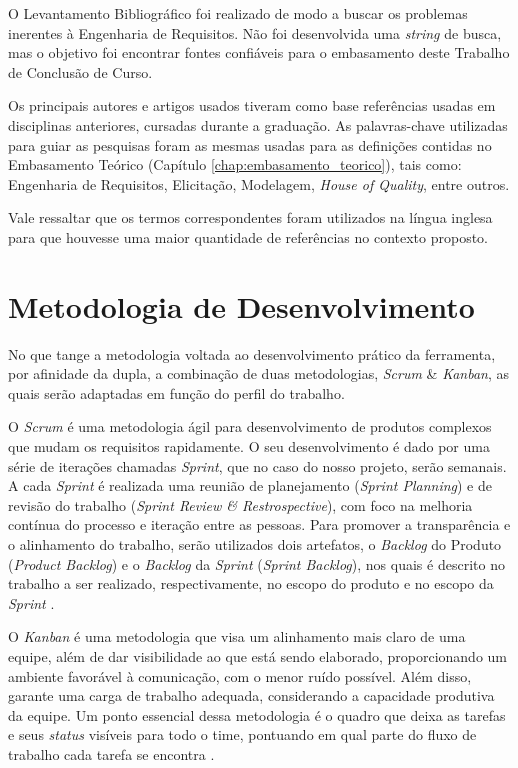 O Levantamento Bibliográfico foi realizado de modo a buscar os problemas inerentes à Engenharia de Requisitos. Não foi desenvolvida uma \textit{string} de busca, mas o objetivo foi encontrar fontes confiáveis para o embasamento deste Trabalho de Conclusão de Curso.

Os principais autores e artigos usados tiveram como base referências usadas em disciplinas anteriores, cursadas durante a graduação. As palavras-chave utilizadas para guiar as pesquisas foram as mesmas usadas para as definições contidas no Embasamento Teórico (Capítulo \ref{chap:embasamento_teorico}), tais como: Engenharia de Requisitos, Elicitação, Modelagem, \textit{House of Quality}, entre outros.

Vale ressaltar que os termos correspondentes foram utilizados na língua inglesa para que houvesse uma maior quantidade de referências no contexto proposto. 

\section{Metodologia de Desenvolvimento}

\label{sec:metodologia_desenvolvimento}

No que tange a metodologia voltada ao desenvolvimento prático da ferramenta, por afinidade da dupla, a combinação de duas metodologias, \textit{Scrum} \& \textit{Kanban}, as quais serão adaptadas em função do perfil do trabalho.

O \textit{Scrum} é uma metodologia ágil para desenvolvimento de produtos complexos que mudam os requisitos rapidamente. O seu desenvolvimento é dado por uma série de iterações chamadas \textit{Sprint}, que no caso do nosso projeto, serão semanais. A cada \textit{Sprint} é realizada uma reunião de planejamento (\textit{Sprint Planning}) e de revisão do trabalho (\textit{Sprint Review \& Restrospective}), com foco na melhoria contínua do processo e iteração entre as pessoas. Para promover a transparência e o alinhamento do trabalho, serão utilizados dois artefatos, o \textit{Backlog} do Produto (\textit{Product Backlog}) e o \textit{Backlog} da \textit{Sprint} (\textit{Sprint Backlog}), nos quais é descrito no trabalho a ser realizado, respectivamente, no escopo do produto e no escopo da \textit{Sprint} \cite{carolipaulo2021}.

O \textit{Kanban} é uma metodologia que visa um alinhamento mais claro de uma equipe, além de dar visibilidade ao que está sendo elaborado, proporcionando um ambiente favorável à comunicação, com o menor ruído possível. Além disso, garante uma carga de trabalho adequada, considerando a capacidade produtiva da equipe. Um ponto essencial dessa metodologia é o quadro que deixa as tarefas e seus \textit{status} visíveis para todo o time, pontuando em qual parte do fluxo de trabalho cada tarefa se encontra \cite{K_Condensed}.

